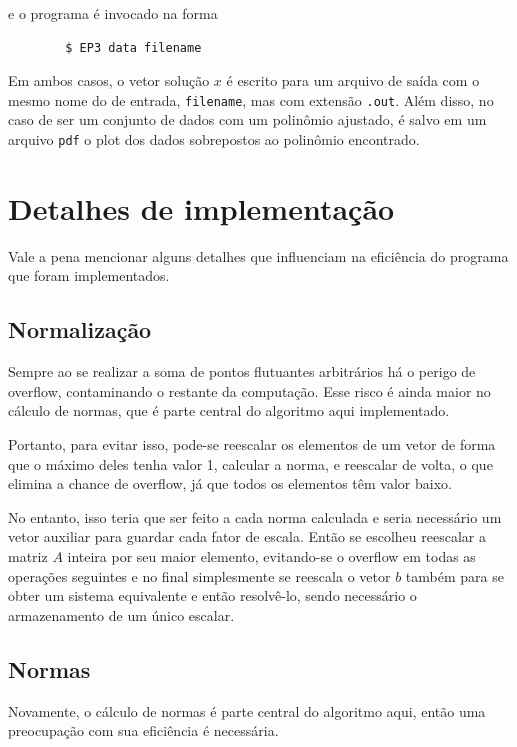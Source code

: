 \documentclass[a4paper,11pt]{article}
\begin{document}
        e o programa é invocado na forma

        \begin{lstlisting}
        $ EP3 data filename
        \end{lstlisting}


        Em ambos casos, o vetor solução $x$ é escrito para um arquivo de saída com o mesmo nome do de entrada, \texttt{filename}, mas com extensão \texttt{.out}.
        Além disso, no caso de ser um conjunto de dados com um polinômio ajustado, é salvo em um arquivo \texttt{pdf} o plot dos dados sobrepostos ao polinômio encontrado.

    \section*{Detalhes de implementação}
        Vale a pena mencionar alguns detalhes que influenciam na eficiência do programa que foram implementados.

        \subsection*{Normalização}
            Sempre ao se realizar a soma de pontos flutuantes arbitrários há o perigo de overflow, contaminando o restante da computação. Esse risco é ainda maior no cálculo de normas, que é parte central do algoritmo aqui implementado.

            Portanto, para evitar isso, pode-se reescalar os elementos de um vetor de forma que o máximo deles tenha valor 1, calcular a norma, e reescalar de volta, o que elimina a chance de overflow, já que todos os elementos têm valor baixo.

            No entanto, isso teria que ser feito a cada norma calculada e seria necessário um vetor auxiliar para guardar cada fator de escala. Então se escolheu reescalar a matriz $A$ inteira por seu maior elemento, evitando-se o overflow em todas as operações seguintes e no final simplesmente se reescala o vetor $b$ também para se obter um sistema equivalente e então resolvê-lo, sendo necessário o armazenamento de um único escalar.

        \subsection*{Normas}
            Novamente, o cálculo de normas é parte central do algoritmo aqui, então uma preocupação com sua eficiência é necessária.
\end{document}

